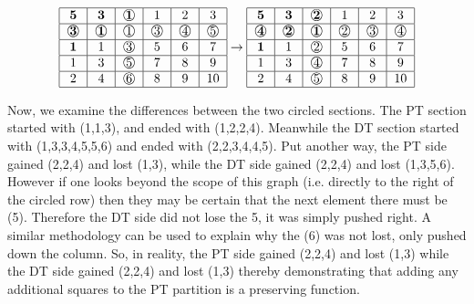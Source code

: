 \documentclass{amsart}
\theoremstyle{definition}
\newcommand{\cir}[1]{\raisebox{.5pt}{\textcircled{\raisebox{-.9pt} {#1}}}}
\begin{document}
\begin{figure}[h]
	\[
	\begin{tabular}{|c|c|c|c|c|c|}
		\hline
		$\mathbf{5}$&$\mathbf{3}$&$\cir{$\mathbf{1}$}$&1&2&3\\
		\hline
		$\cir{$\mathbf{3}$}$&$\cir{$\mathbf{1}$}$&$\cir{1}$&$\cir{3}$&$\cir{4}$&$\cir{5}$\\
		\hline
		$\mathbf{1}$&1&$\cir{3}$&5&6&7\\
		\hline
		1&3&$\cir{5}$&7&8&9\\
		\hline
		2&4&$\cir{6}$&8&9&10\\
		\hline
	\end{tabular}
	\rightarrow
	\begin{tabular}{|c|c|c|c|c|c|}
		\hline
		$\mathbf{5}$&$\mathbf{3}$&$\cir{\textbf{2}}$&1&2&3\\
		\hline
		$\cir{\textbf{4}}$&$\cir{\textbf{2}}$&$\cir{\textbf{1}}$&$\cir{2}$&$\cir{3}$&$\cir{4}$\\
		\hline
		$\mathbf{1}$&1&$\cir{2}$&5&6&7\\
		\hline
		1&3&$\cir{4}$&7&8&9\\
		\hline
		2&4&$\cir{5}$&8&9&10\\
		\hline
	\end{tabular}
	\]
\end{figure}

Now, we examine the differences between the two circled sections.  The PT section started with (1,1,3), and ended with (1,2,2,4).  Meanwhile the DT section started with (1,3,3,4,5,5,6) and ended with (2,2,3,4,4,5).  Put another way, the PT side gained (2,2,4) and lost (1,3), while the DT side gained (2,2,4) and lost (1,3,5,6).  However if one looks beyond the scope of this graph (i.e. directly to the right of the circled row) then they may be certain that the next element there must be (5).  Therefore the DT side did not lose the 5, it was simply pushed right.  A similar methodology can be used to explain why the (6) was not lost, only pushed down the column.  So, in reality, the PT side gained (2,2,4) and lost (1,3) while the DT side gained (2,2,4) and lost (1,3) thereby demonstrating that adding any additional squares to the PT partition is a preserving function.
\end{document}
